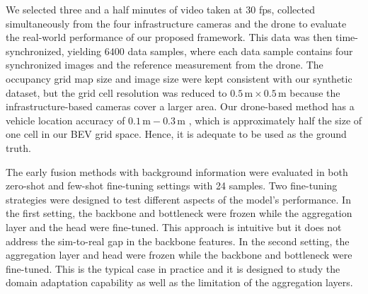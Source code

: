 We selected three and a half minutes of video taken at $30$ fps, collected simultaneously from the four infrastructure cameras and the drone to evaluate the real-world performance of our proposed framework. This data was then time-synchronized, yielding $6400$ data samples, where each data sample contains four synchronized images and the reference measurement from the drone. The occupancy grid map size and image size were kept consistent with our synthetic dataset, but the grid cell resolution was reduced to $0.5\,\text{m}\times 0.5\,\text{m}$ because the infrastructure-based cameras cover a larger area. Our drone-based method has a vehicle location accuracy of $0.1\,\text{m}-0.3\,\text{m}$ \cite{lu2023carom}, which is approximately half the size of one cell in our BEV grid space. Hence, it is adequate to be used as the ground truth.

The early fusion methods with background information were evaluated in both zero-shot and few-shot fine-tuning settings with 24 samples. Two fine-tuning strategies were designed to test different aspects of the model's performance. In the first setting, the backbone and bottleneck were frozen while the aggregation layer and the head were fine-tuned. This approach is intuitive but it does not address the sim-to-real gap in the backbone features. In the second setting, the aggregation layer and head were frozen while the backbone and bottleneck were fine-tuned. This is the typical case in practice and it is designed to study the domain adaptation capability as well as the limitation of the aggregation layers.


\begin{table}[h!]
\centering
{}
\caption{Performance evaluation of Models in real-world under zero-shot and few-shot fine-tuning settings.}
\label{tab:few-shot-table}
\vspace{-0.2in}
\end{table}

